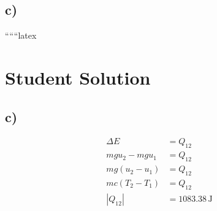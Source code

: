 

\subsection*{c)}

``````latex

\section*{Student Solution}



\subsection*{c)}

\begin{align*}
\Delta E &= Q_{12} \\
m g u_2 - m g u_1 &= Q_{12} \\
m g (u_2 - u_1) &= Q_{12} \\
m c (T_2 - T_1) &= Q_{12} \\
|Q_{12}| &= 1083.38 \, \text{J}
\end{align*}